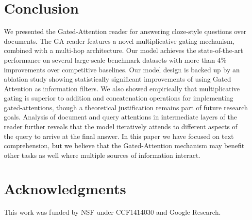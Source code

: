 \documentclass[11pt,a4paper]{article}
\begin{document}
\section{Conclusion}
\label{sec:conclusion}
We presented the Gated-Attention reader for answering cloze-style questions over documents.
The GA reader features a novel multiplicative gating mechanism, combined with a multi-hop architecture.
Our model achieves the state-of-the-art performance on several large-scale benchmark datasets with more than 4\% improvements over competitive baselines. Our model design is backed up by an ablation study showing statistically significant improvements of using Gated Attention as information filters. We also showed empirically that multiplicative gating is superior to addition and concatenation operations for implementing gated-attentions, though a theoretical justification remains part of future research goals. Analysis of document and query attentions in intermediate layers of the reader further reveals that the model iteratively attends to different aspects of the query to arrive at the final answer. In this paper we have focused on text comprehension, but we believe that the Gated-Attention mechanism may benefit other tasks as well where multiple sources of information interact.





\section*{Acknowledgments}
This work was funded by NSF under CCF1414030 and Google Research.




\appendix

\vspace{-0.05in}
\end{document}
